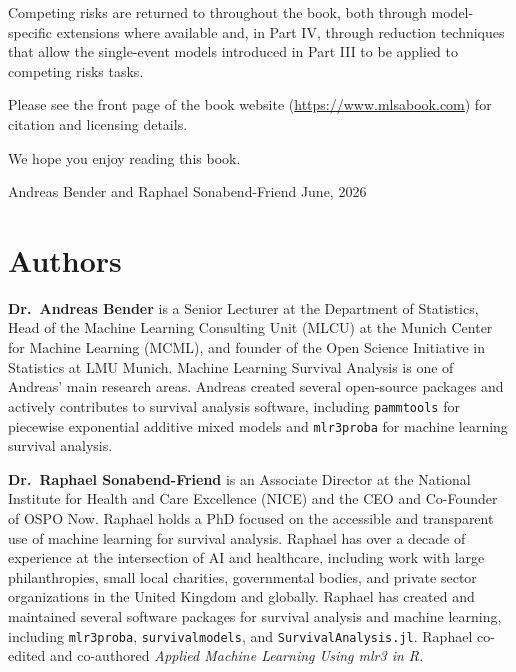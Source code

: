 \documentclass[
  letterpaper,
  krantz2]{style/krantz}
\begin{document}
Competing risks are returned to throughout the book, both through
model-specific extensions where available and, in Part IV, through
reduction techniques that allow the single-event models introduced in
Part III to be applied to competing risks tasks.

\vspace{10mm}

Please see the front page of the book website
(\url{https://www.mlsabook.com}) for citation and licensing details.

\vspace{10mm}

We hope you enjoy reading this book.

\vspace{3mm}

Andreas Bender and Raphael Sonabend-Friend\newline
June, 2026

\chapter*{Authors}

\textbf{Dr.~Andreas Bender} is a Senior Lecturer at the Department of
Statistics, Head of the Machine Learning Consulting Unit (MLCU) at the
Munich Center for Machine Learning (MCML), and founder of the Open
Science Initiative in Statistics at LMU Munich. Machine Learning
Survival Analysis is one of Andreas' main research areas. Andreas
created several open-source packages and actively contributes to
survival analysis software, including \texttt{pammtools} for piecewise
exponential additive mixed models and \texttt{mlr3proba} for machine
learning survival analysis.

\textbf{Dr.~Raphael Sonabend-Friend} is an Associate Director at the
National Institute for Health and Care Excellence (NICE) and the CEO and
Co-Founder of OSPO Now. Raphael holds a PhD focused on the accessible
and transparent use of machine learning for survival analysis. Raphael
has over a decade of experience at the intersection of AI and
healthcare, including work with large philanthropies, small local
charities, governmental bodies, and private sector organizations in the
United Kingdom and globally. Raphael has created and maintained several
software packages for survival analysis and machine learning, including
\texttt{mlr3proba}, \texttt{survivalmodels}, and
\texttt{SurvivalAnalysis.jl}. Raphael co-edited and co-authored
\emph{Applied Machine Learning Using mlr3 in R.}
\end{document}

